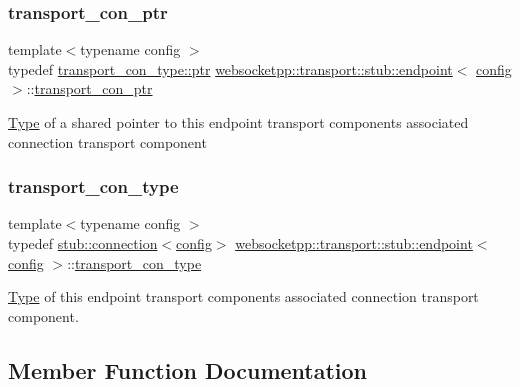 \subsubsection{\texorpdfstring{transport\+\_\+con\+\_\+ptr}{transport\_con\_ptr}}
{\footnotesize\ttfamily template$<$typename config $>$ \\
typedef \mbox{\hyperlink{classwebsocketpp_1_1transport_1_1stub_1_1connection_aeb856d2a6734d303e13bed57c3d1081b}{transport\+\_\+con\+\_\+type\+::ptr}} \mbox{\hyperlink{classwebsocketpp_1_1transport_1_1stub_1_1endpoint}{websocketpp\+::transport\+::stub\+::endpoint}}$<$ \mbox{\hyperlink{classconfig}{config}} $>$\+::\mbox{\hyperlink{classwebsocketpp_1_1transport_1_1stub_1_1endpoint_af2bad83f2577d578712642e11767efe1}{transport\+\_\+con\+\_\+ptr}}}

\mbox{\hyperlink{struct_type}{Type}} of a shared pointer to this endpoint transport component\textquotesingle{}s associated connection transport component \mbox{\label{classwebsocketpp_1_1transport_1_1stub_1_1endpoint_a6486b94320ba134cb60a63b4c40194a0}} 
\subsubsection{\texorpdfstring{transport\+\_\+con\+\_\+type}{transport\_con\_type}}
{\footnotesize\ttfamily template$<$typename config $>$ \\
typedef \mbox{\hyperlink{classwebsocketpp_1_1transport_1_1stub_1_1connection}{stub\+::connection}}$<$\mbox{\hyperlink{classconfig}{config}}$>$ \mbox{\hyperlink{classwebsocketpp_1_1transport_1_1stub_1_1endpoint}{websocketpp\+::transport\+::stub\+::endpoint}}$<$ \mbox{\hyperlink{classconfig}{config}} $>$\+::\mbox{\hyperlink{classwebsocketpp_1_1transport_1_1stub_1_1endpoint_a6486b94320ba134cb60a63b4c40194a0}{transport\+\_\+con\+\_\+type}}}

\mbox{\hyperlink{struct_type}{Type}} of this endpoint transport component\textquotesingle{}s associated connection transport component. 

\subsection{Member Function Documentation}
\mbox{\label{classwebsocketpp_1_1transport_1_1stub_1_1endpoint_ad912ae8113d6c879fab22daaeba964b9}} 
